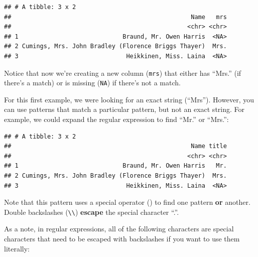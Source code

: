 \documentclass[]{book}
\makeatletter
\newenvironment{Shaded}{\begin{snugshade}}{\end{snugshade}}
\newcommand{\KeywordTok}[1]{\textcolor[rgb]{0.13,0.29,0.53}{\textbf{#1}}}
\newcommand{\DataTypeTok}[1]{\textcolor[rgb]{0.13,0.29,0.53}{#1}}
\newcommand{\DecValTok}[1]{\textcolor[rgb]{0.00,0.00,0.81}{#1}}
\newcommand{\CharTok}[1]{\textcolor[rgb]{0.31,0.60,0.02}{#1}}
\newcommand{\StringTok}[1]{\textcolor[rgb]{0.31,0.60,0.02}{#1}}
\newcommand{\OperatorTok}[1]{\textcolor[rgb]{0.81,0.36,0.00}{\textbf{#1}}}
\newcommand{\NormalTok}[1]{#1}
\newenvironment{kframe}{%
\medskip{}
\setlength{\fboxsep}{.8em}
 \def\at@end@of@kframe{}%
 \ifinner\ifhmode%
  \def\at@end@of@kframe{\end{minipage}}%
  \begin{minipage}{\columnwidth}%
 \fi\fi%
 \def\FrameCommand##1{\hskip\@totalleftmargin \hskip-\fboxsep
 \colorbox{shadecolor}{##1}\hskip-\fboxsep
     \hskip-\linewidth \hskip-\@totalleftmargin \hskip\columnwidth}%
 \MakeFramed {\advance\hsize-\width
   \@totalleftmargin\z@ \linewidth\hsize
   \@setminipage}}%
 {\par\unskip\endMakeFramed%
 \at@end@of@kframe}
\renewenvironment{Shaded}{\begin{kframe}}{\end{kframe}}
\theoremstyle{definition}
\theoremstyle{definition}
\theoremstyle{definition}
\theoremstyle{remark}
\makeatother
\begin{document}
\begin{verbatim}
## # A tibble: 3 x 2
##                                                  Name   mrs
##                                                 <chr> <chr>
## 1                             Braund, Mr. Owen Harris  <NA>
## 2 Cumings, Mrs. John Bradley (Florence Briggs Thayer)  Mrs.
## 3                              Heikkinen, Miss. Laina  <NA>
\end{verbatim}

Notice that now we're creating a new column (\texttt{mrs}) that either
has ``Mrs.'' (if there's a match) or is missing (\texttt{NA}) if there's
not a match.

For this first example, we were looking for an exact string (``Mrs'').
However, you can use patterns that match a particular pattern, but not
an exact string. For example, we could expand the regular expression to
find ``Mr.'' or ``Mrs.'':

\begin{Shaded}
\end{Shaded}

\begin{verbatim}
## # A tibble: 3 x 2
##                                                  Name title
##                                                 <chr> <chr>
## 1                             Braund, Mr. Owen Harris   Mr.
## 2 Cumings, Mrs. John Bradley (Florence Briggs Thayer)  Mrs.
## 3                              Heikkinen, Miss. Laina  <NA>
\end{verbatim}

Note that this pattern uses a special operator (\texttt{\textbar{}}) to
find one pattern \textbf{or} another. Double backslashes
(\texttt{\textbackslash{}\textbackslash{}}) \textbf{escape} the special
character ``.''.

As a note, in regular expressions, all of the following characters are
special characters that need to be escaped with backslashes if you want
to use them literally:
\end{document}
